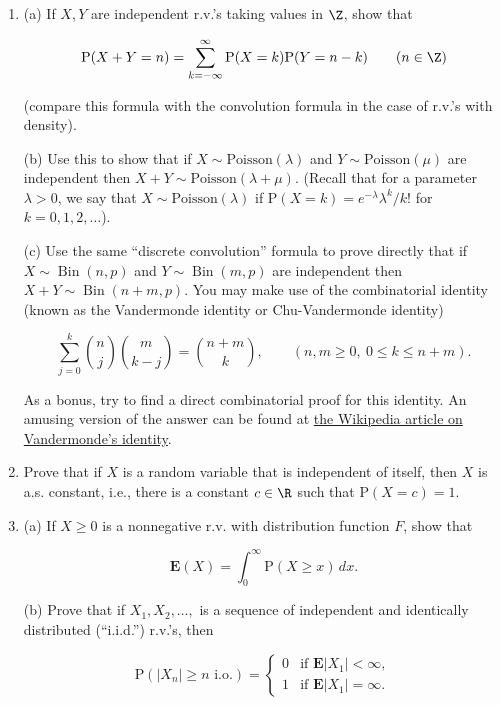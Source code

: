 \begin{enumerate}[label=\arabic*.]
\begin{enumerate}[label=\arabic*.]
\item $X \sim \textrm{Exp}(\lambda)$
\end{enumerate}

\item (a) If $X,Y$ are independent r.v.'s taking values in
$\Z$, show that

\[
\mathrm{P}(X+Y = n) = \sum_{k=-\infty}^\infty \mathrm{P}(X=k) \mathrm{P}(Y=n-k) \qquad(n\in\Z)
\]

\noindent (compare this formula with the convolution formula in
the case of r.v.'s with density).

(b) Use this to show that if
$X\sim \textrm{Poisson}(\lambda)$ and
$Y\sim \textrm{Poisson}(\mu)$ are independent then
$X+Y \sim \textrm{Poisson}(\lambda+\mu)$. (Recall
that for a parameter $\lambda>0$, we say that
$X\sim \textrm{Poisson}(\lambda)$ if
$\mathrm{P}(X=k)=e^{-\lambda} \lambda^k/k!$ for
$k=0,1,2,\ldots$).

(c) Use the same ``discrete convolution'' formula to
prove directly that if
$X \sim \operatorname{Bin}(n,p)$ and
$Y\sim \operatorname{Bin}(m,p)$ are independent then
$X+Y \sim \operatorname{Bin}(n+m,p)$. You may make
use of the combinatorial identity (known as the
Vandermonde identity or Chu-Vandermonde identity)

\[
\sum_{j=0}^k \binom{n}{j} \binom{m}{k-j} = \binom{n+m}{k}, \qquad (n,m\ge 0,\ 0\le k\le n+m).
\]

\noindent As a bonus, try to find a direct combinatorial proof
for this identity. An amusing version of the answer
can be found at \href{http://en.wikipedia.org/wiki/Vandermonde's_identity}{the Wikipedia article on
Vandermonde's
identity}.

\item Prove that if $X$ is a random variable that is
independent of itself, then $X$ is a.s. constant,
i.e., there is a constant $c\in\R$ such that
$\mathrm{P}(X=c)=1$.

\item (a) If $X\ge 0$ is a nonnegative r.v. with
distribution function $F$, show that

\[
\mathbf{E}(X)=\int_0^\infty \mathrm{P}(X\ge x)\,dx.
\]

\noindent (b) Prove that if $X_1, X_2, \ldots,$ is a sequence
of independent and identically distributed
(``i.i.d.'') r.v.'s, then

\[
\mathrm{P}(|X_n|\ge n\textrm{ i.o.})=\begin{cases} 0 & \textrm{if }\mathbf{E}|X_1|<\infty, \\
1 & \textrm{if }\mathbf{E}|X_1|=\infty. \end{cases}
\]


\end{enumerate}

